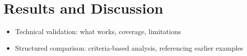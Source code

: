 \chapter{Results and Discussion} %
  \label{Results and Discussion} %


\begin{marker}[high]
\begin{itemize}
  \item Technical validation: what works, coverage, limitations
  \item Structured comparison: criteria-based analysis, referencing earlier examples
\end{itemize}
\end{marker}






















